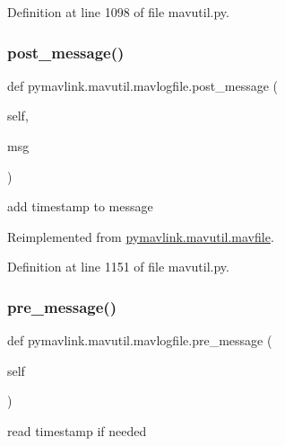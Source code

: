 Definition at line 1098 of file mavutil.\+py.

\mbox{\label{classpymavlink_1_1mavutil_1_1mavlogfile_ac304637b0b24999e12763ccbc59a2085}} 
\subsubsection{\texorpdfstring{post\_message()}{post\_message()}}
{\footnotesize\ttfamily def pymavlink.\+mavutil.\+mavlogfile.\+post\+\_\+message (\begin{DoxyParamCaption}\item[{}]{self,  }\item[{}]{msg }\end{DoxyParamCaption})}

\begin{DoxyVerb}add timestamp to message\end{DoxyVerb}
 

Reimplemented from \mbox{\hyperlink{classpymavlink_1_1mavutil_1_1mavfile_a6307d32e7cc751320cb1fe84a1a43049}{pymavlink.\+mavutil.\+mavfile}}.



Definition at line 1151 of file mavutil.\+py.

\mbox{\label{classpymavlink_1_1mavutil_1_1mavlogfile_ad3bd6ab83073f82be56c6d393e6ea6c3}} 
\subsubsection{\texorpdfstring{pre\_message()}{pre\_message()}}
{\footnotesize\ttfamily def pymavlink.\+mavutil.\+mavlogfile.\+pre\+\_\+message (\begin{DoxyParamCaption}\item[{}]{self }\end{DoxyParamCaption})}

\begin{DoxyVerb}read timestamp if needed\end{DoxyVerb}
 

